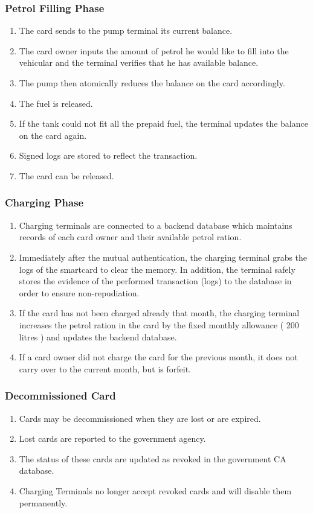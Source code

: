 \subsubsection{Petrol Filling Phase}
\begin{enumerate}
  \item The card sends to the pump terminal its current balance.
  \item The card owner inputs the amount of petrol he would like to fill into the vehicular and the terminal verifies that he has available balance.
  \item The pump then atomically reduces the balance on the card accordingly.
  \item The fuel is released.
  \item If the tank could not fit all the prepaid fuel, the terminal updates the balance on the card again.
  \item Signed logs are stored to reflect the transaction.
  \item The card can be released.
\end{enumerate}

\subsubsection{Charging Phase}
\begin{enumerate}
  \item Charging terminals are connected to a backend database which maintains records of each card owner and their available petrol ration.
  \item Immediately after the mutual authentication, the charging terminal grabs the logs of the smartcard to clear the memory.  In addition, the terminal safely stores the evidence of the performed transaction (logs) to the database in order to ensure non-repudiation.
  \item If the card has not been charged already that month, the charging terminal increases the petrol ration in the card by the fixed monthly allowance ( 200 litres ) and updates the backend database. 
  \item If a card owner did not charge the card for the previous month, it does not carry over to the current month, but is forfeit.
\end{enumerate}


\subsubsection{Decommissioned Card}

\begin{enumerate}
  \item Cards may be decommissioned when they are lost or are expired.
  \item Lost cards are reported to the government agency.
  \item The status of these cards are updated as revoked in the government CA database.
  \item Charging Terminals no longer accept revoked cards and will disable them permanently.
\end{enumerate}

